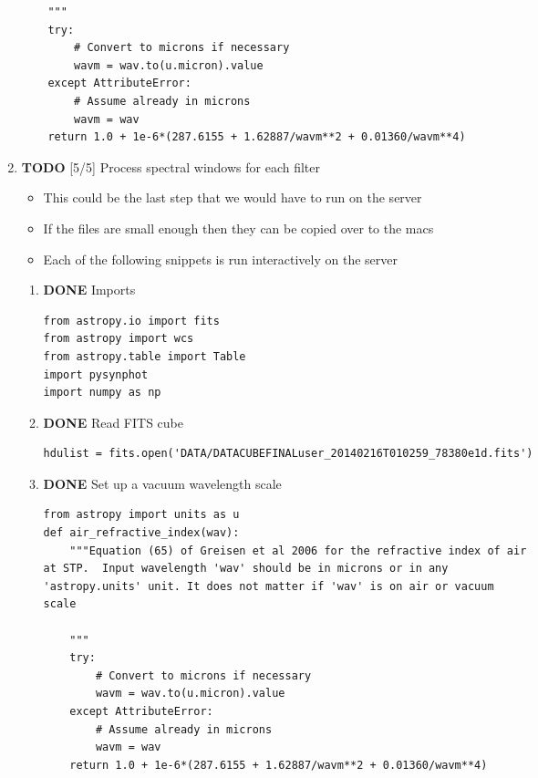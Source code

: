 \documentclass[11pt]{article}
\begin{document}
\begin{enumerate}
\begin{verbatim}
    """
    try:
        # Convert to microns if necessary
        wavm = wav.to(u.micron).value
    except AttributeError:
        # Assume already in microns
        wavm = wav
    return 1.0 + 1e-6*(287.6155 + 1.62887/wavm**2 + 0.01360/wavm**4)
\end{verbatim}
\item {\bfseries\sffamily TODO} [5/5] Process spectral windows for each filter
\label{sec:orgheadline27}
\begin{itemize}
\item This could be the last step that we would have to run on the server
\item If the files are small enough then they can be copied over to the macs
\item Each of the following snippets is run interactively on the server
\end{itemize}
\begin{enumerate}
\item {\bfseries\sffamily DONE} Imports
\label{sec:orgheadline22}
\begin{verbatim}
from astropy.io import fits
from astropy import wcs
from astropy.table import Table
import pysynphot
import numpy as np
\end{verbatim}
\item {\bfseries\sffamily DONE} Read FITS cube
\label{sec:orgheadline23}
\begin{verbatim}
hdulist = fits.open('DATA/DATACUBEFINALuser_20140216T010259_78380e1d.fits')
\end{verbatim}
\item {\bfseries\sffamily DONE} Set up a vacuum wavelength scale
\label{sec:orgheadline24}
\begin{verbatim}
from astropy import units as u
def air_refractive_index(wav):
    """Equation (65) of Greisen et al 2006 for the refractive index of air
at STP.  Input wavelength 'wav' should be in microns or in any
'astropy.units' unit. It does not matter if 'wav' is on air or vacuum
scale

    """
    try:
        # Convert to microns if necessary
        wavm = wav.to(u.micron).value
    except AttributeError:
        # Assume already in microns
        wavm = wav
    return 1.0 + 1e-6*(287.6155 + 1.62887/wavm**2 + 0.01360/wavm**4)


\end{verbatim}
\end{enumerate}
\end{enumerate}
\end{document}
